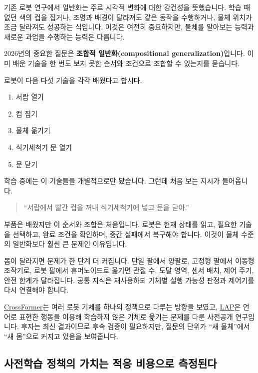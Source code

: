 \documentclass[11pt,openany]{book}
\newcommand{\keyterm}[1]{{\sffamily\bfseries\color{deepblue}#1}}
\begin{document}
기존 로봇 연구에서 일반화는 주로 시각적 변화에 대한 강건성을 뜻했습니다. 학습 때 없던 색의 컵을 집거나, 조명과 배경이 달라져도 같은 동작을 수행하거나, 물체 위치가 조금 달라져도 성공하는 식입니다. 이것은 여전히 중요하지만, 물체를 알아보는 능력과 새로운 과업을 수행하는 능력은 다릅니다.

2026년의 중요한 질문은 \keyterm{조합적 일반화(compositional generalization)}입니다. 이미 배운 기술을 한 번도 보지 못한 순서와 조건으로 조합할 수 있는지를 묻습니다.

\begin{examplebox}
로봇이 다음 다섯 기술을 각각 배웠다고 합시다.

\begin{enumerate}
  \item 서랍 열기
  \item 컵 집기
  \item 물체 옮기기
  \item 식기세척기 문 열기
  \item 문 닫기
\end{enumerate}

학습 중에는 이 기술들을 개별적으로만 봤습니다. 그런데 처음 보는 지시가 들어옵니다.

\begin{quote}
``서랍에서 빨간 컵을 꺼내 식기세척기에 넣고 문을 닫아.''
\end{quote}

부품은 배웠지만 이 순서와 조합은 처음입니다. 로봇은 현재 상태를 읽고, 필요한 기술을 선택하고, 완료 조건을 확인하며, 중간 실패에서 복구해야 합니다. 이것이 물체 수준의 일반화보다 훨씬 큰 문제인 이유입니다.
\end{examplebox}

몸이 달라지면 문제가 한 단계 더 커집니다. 단일 팔에서 양팔로, 고정형 팔에서 이동형 조작기로, 로봇 팔에서 휴머노이드로 옮기면 관절 수, 도달 영역, 센서 배치, 제어 주기, 안전 한계가 달라집니다. 공통 지식은 재사용하되 기체별 실행 가능성 판정과 제어기를 다시 연결해야 합니다.

\href{https://proceedings.mlr.press/v270/doshi25a.html}{CrossFormer}는 여러 로봇 기체를 하나의 정책으로 다루는 방향을 보였고, \href{https://arxiv.org/abs/2602.10556}{LAP}은 언어로 표현한 행동을 이용해 학습하지 않은 기체로 옮기는 문제를 다룬 사전공개 연구입니다. 후자는 최신 결과이므로 후속 검증이 필요하지만, 질문의 단위가 ``새 물체''에서 ``새 몸''으로 커지고 있음을 보여줍니다.

\subsection*{사전학습 정책의 가치는 적응 비용으로 측정된다}
\end{document}
